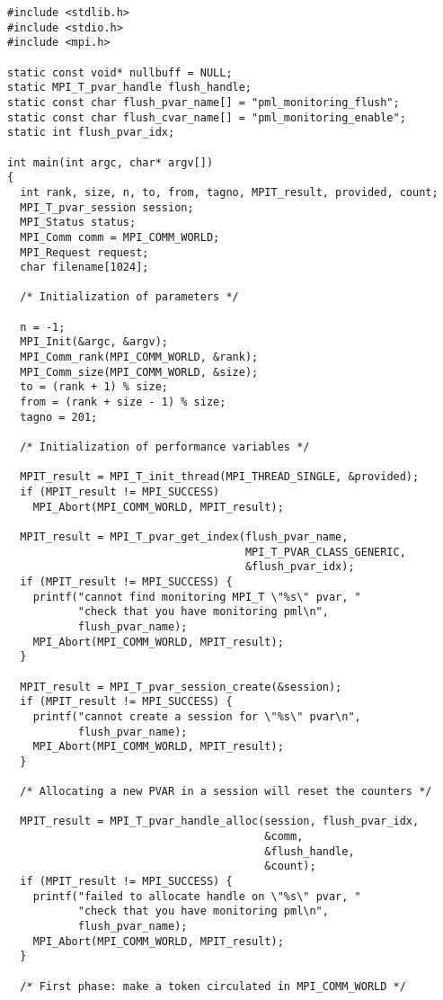 \documentclass[notitlepage]{article}
\begin{document}
\begin{verbatim}
#include <stdlib.h>
#include <stdio.h>
#include <mpi.h>

static const void* nullbuff = NULL;
static MPI_T_pvar_handle flush_handle;
static const char flush_pvar_name[] = "pml_monitoring_flush";
static const char flush_cvar_name[] = "pml_monitoring_enable";
static int flush_pvar_idx;

int main(int argc, char* argv[])
{
  int rank, size, n, to, from, tagno, MPIT_result, provided, count;
  MPI_T_pvar_session session;
  MPI_Status status;
  MPI_Comm comm = MPI_COMM_WORLD;
  MPI_Request request;
  char filename[1024];

  /* Initialization of parameters */

  n = -1;
  MPI_Init(&argc, &argv);
  MPI_Comm_rank(MPI_COMM_WORLD, &rank);
  MPI_Comm_size(MPI_COMM_WORLD, &size);
  to = (rank + 1) % size;
  from = (rank + size - 1) % size;
  tagno = 201;

  /* Initialization of performance variables */

  MPIT_result = MPI_T_init_thread(MPI_THREAD_SINGLE, &provided);
  if (MPIT_result != MPI_SUCCESS)
    MPI_Abort(MPI_COMM_WORLD, MPIT_result);

  MPIT_result = MPI_T_pvar_get_index(flush_pvar_name,
                                     MPI_T_PVAR_CLASS_GENERIC,
                                     &flush_pvar_idx);
  if (MPIT_result != MPI_SUCCESS) {
    printf("cannot find monitoring MPI_T \"%s\" pvar, "
           "check that you have monitoring pml\n",
           flush_pvar_name);
    MPI_Abort(MPI_COMM_WORLD, MPIT_result);
  }

  MPIT_result = MPI_T_pvar_session_create(&session);
  if (MPIT_result != MPI_SUCCESS) {
    printf("cannot create a session for \"%s\" pvar\n",
           flush_pvar_name);
    MPI_Abort(MPI_COMM_WORLD, MPIT_result);
  }

  /* Allocating a new PVAR in a session will reset the counters */

  MPIT_result = MPI_T_pvar_handle_alloc(session, flush_pvar_idx,
                                        &comm,
                                        &flush_handle,
                                        &count);
  if (MPIT_result != MPI_SUCCESS) {
    printf("failed to allocate handle on \"%s\" pvar, "
           "check that you have monitoring pml\n",
           flush_pvar_name);
    MPI_Abort(MPI_COMM_WORLD, MPIT_result);
  }

  /* First phase: make a token circulated in MPI_COMM_WORLD */


\end{verbatim}
\end{document}
